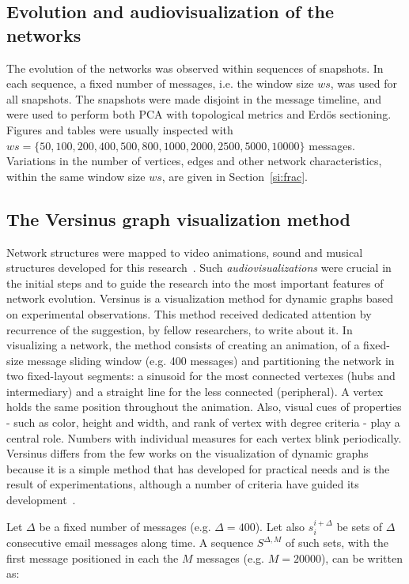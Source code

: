 \subsection{Evolution and audiovisualization of the networks}\label{sec:viz}
The evolution of the networks was observed within 
sequences of snapshots. In each sequence, a fixed number of messages,
i.e. the window size $ws$, was used for all snapshots.
The snapshots were made disjoint in the message timeline, and were used to perform both PCA with topological metrics and Erd\"os sectioning.  
Figures and tables were usually inspected with 
$ws=\{50, 100, 200, 400, 500, 800, 1000, 2000, 2500, 5000, 10000\}$ messages. Variations in the number of vertices, edges
and other network characteristics, within the same window size $ws$,
are given in Section~\ref*{si:frac}. 

\subsection{The Versinus graph visualization method}
Network structures were mapped to video animations, sound and musical structures developed for this research~\cite{animacoes}.%
Such \emph{audiovisualizations} were crucial in the initial steps and
to guide the research into the most important features of network evolution.
Versinus is a visualization method for dynamic graphs based on experimental observations.
This method received dedicated attention by recurrence of the suggestion, by fellow researchers,
to write about it.  
In visualizing a network, the method consists of creating an animation,
of a fixed-size message sliding window (e.g. 400 messages) and 
partitioning the network in two fixed-layout segments:
a sinusoid for the most connected vertexes (hubs and intermediary)
and a straight line for the less connected (peripheral).
A vertex holds the same position throughout the animation. Also,
visual cues of properties - such as color, height and width,
and rank of vertex with degree criteria - play a central role.
Numbers with individual measures for each vertex blink periodically.
Versinus differs from the few works on the visualization of dynamic
graphs because it is a simple method that has developed for practical needs and is the result of experimentations,
although a number of criteria have guided its development~\cite{Viz1,Viz2,Viz3}.

Let $\Delta$ be a fixed number of messages (e.g. $\Delta=400$).
Let also $s_{i}^{i+\Delta}$ be sets of $\Delta$ consecutive email messages along time.
A sequence $S^{\Delta,M}$ of such sets,
with the first message positioned in each the $M$ messages (e.g. $M=20000$),
can be written as: 

